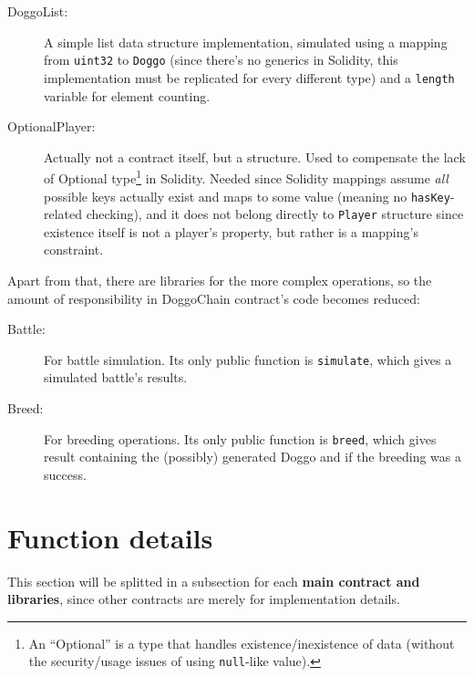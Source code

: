 \documentclass{article}
\begin{document}
    \begin{description}
        \item[DoggoList:] A simple list data structure implementation,
            simulated using a mapping from \texttt{uint32} to \texttt{Doggo}
            (since there's no generics in Solidity, this implementation must be
            replicated for every different type) and a \texttt{length} variable
            for element counting.
        \item[OptionalPlayer:] Actually not a contract itself, but a structure.
            Used to compensate the lack of Optional type\footnote{%
                An ``Optional'' is a type that handles existence/inexistence of
                data (without the security/usage issues of using
                \texttt{null}-like value).
            } in Solidity. Needed since Solidity mappings assume \textit{all}
            possible keys actually exist and maps to some value (meaning no
            \texttt{hasKey}-related checking), and it does not belong directly
            to \texttt{Player} structure since existence itself is not a
            player's property, but rather is a mapping's constraint.
    \end{description}

    Apart from that, there are libraries for the more complex operations, so
    the amount of responsibility in DoggoChain contract's code becomes reduced:

    \begin{description}
        \item[Battle:] For battle simulation. Its only public function is
            \texttt{simulate}, which gives a simulated battle's results.
        \item[Breed:] For breeding operations. Its only public function is
            \texttt{breed}, which gives result containing the (possibly)
            generated Doggo and if the breeding was a success.
    \end{description}


    \section{Function details\label{sec:function-desc}}

    This section will be splitted in a subsection for each \textbf{main
    contract and libraries}, since other contracts are merely for
    implementation details.
\end{document}
